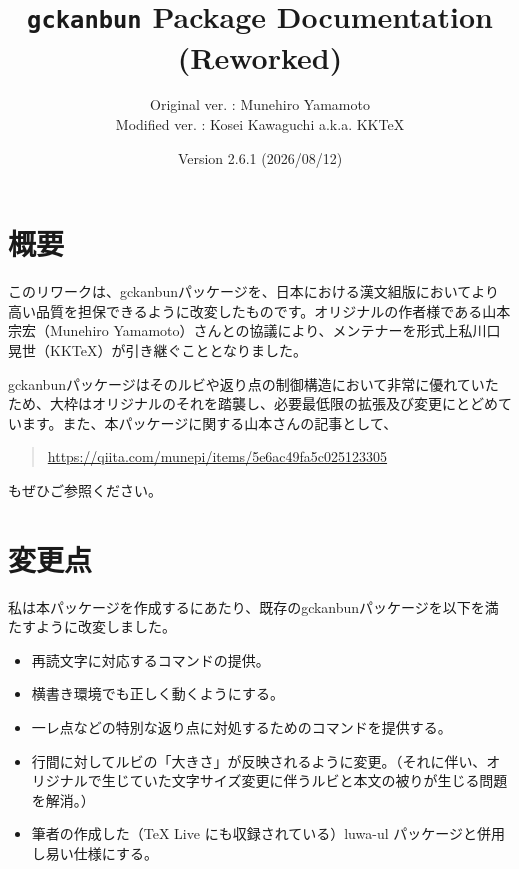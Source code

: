 \documentclass[luatex,fontsize=8pt,paper=b5,twoside]{jlreq}%
\title{\texttt{gckanbun} Package Documentation (Reworked)}
\author{%
\parbox[r]{8cm}{%
  Original ver. : Munehiro Yamamoto\\
  Modified ver. : Kosei Kawaguchi a.k.a. KKTeX
}}
\date{Version 2.6.1 (2026/08/12)}
\begin{document}
\begin{titlepage}
  \maketitle
\end{titlepage}
\newpage
\tableofcontents
\newpage

\section{概要}
このリワークは、gckanbunパッケージを、日本における漢文組版においてより高い品質を担保できるように改変したものです。オリジナルの作者様である山本宗宏（Munehiro Yamamoto）さんとの協議により、メンテナーを形式上私川口晃世（KKTeX）が引き継ぐこととなりました。

gckanbunパッケージはそのルビや返り点の制御構造において非常に優れていたため、大枠はオリジナルのそれを踏襲し、必要最低限の拡張及び変更にとどめています。また、本パッケージに関する山本さんの記事として、
\begin{quotation}
  \url{https://qiita.com/munepi/items/5e6ac49fa5c025123305}
\end{quotation}
\noindent もぜひご参照ください。

\section{変更点}
私は本パッケージを作成するにあたり、既存のgckanbunパッケージを以下を満たすように改変しました。

\begin{itemize}
  \item[\seihou{1}] \hspace{\zw}再読文字に対応するコマンドの提供。
  \item[\seihou{2}] \hspace{\zw}横書き環境でも正しく動くようにする。
  \item[\seihou{3}] \hspace{\zw}一レ点などの特別な返り点に対処するためのコマンドを提供する。
  \item[\seihou{4}] \hspace{\zw}行間に対してルビの「大きさ」が反映されるように変更。（それに伴い、オリジナルで生じていた文字サイズ変更に伴うルビと本文の被りが生じる問題を解消。）
  \item[\seihou{5}] \hspace{\zw}筆者の作成した（TeX Live にも収録されている）luwa-ul パッケージと併用し易い仕様にする。
\end{itemize}
\end{document}
